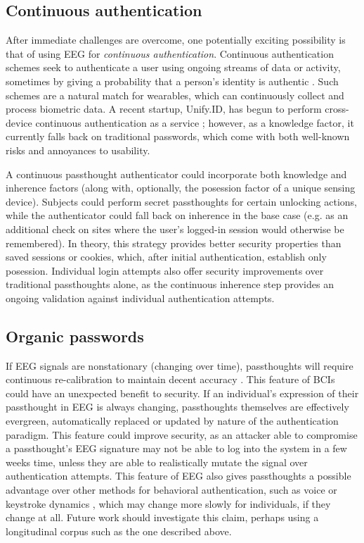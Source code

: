 \documentclass[sigconf]{acmart}
\begin{document}
\subsection{Continuous authentication}
\label{sec:orgbac1c33}

After immediate challenges are overcome,
one potentially exciting possibility is that of using EEG for \emph{continuous authentication}.
Continuous authentication schemes seek to authenticate a user using ongoing streams of data or activity, sometimes by giving a probability that a person's identity is authentic \cite{Bojinov2012}.
Such schemes are a natural match for wearables, which can continuously collect and process biometric data.
A recent startup, Unify.ID, has begun to perform cross-device continuous authentication as a service \cite{UnifyID2017};
however, as a knowledge factor, it currently falls back on traditional passwords, which come with both well-known risks and annoyances to usability.

A continuous passthought authenticator could incorporate both knowledge and inherence factors (along with, optionally, the posession factor of a unique sensing device).
Subjects could perform secret passthoughts for certain unlocking actions,
while the authenticator could fall back on inherence in the base case (e.g. as an additional check on sites where the user's logged-in session would otherwise be remembered).
In theory, this strategy provides better security properties than saved sessions or cookies, 
which, after initial authentication, establish only posession. 
Individual login attempts also offer security improvements over traditional passthoughts alone, as the continuous inherence step provides an ongoing validation against individual authentication attempts.

\subsection{Organic passwords}
\label{sec:org252a6e3}

If EEG signals are nonstationary (changing over time), passthoughts will require
continuous re-calibration to maintain decent accuracy \cite{Vidaurre2006a}. This
feature of BCIs could have an unexpected benefit to security. If an individual's
expression of their passthought in EEG is always changing, passthoughts
themselves are effectively evergreen, automatically replaced or updated by
nature of the authentication paradigm. This feature could improve security, as
an attacker able to compromise a passthought's EEG signature may not be able to
log into the system in a few weeks time, unless they are able to realistically
mutate the signal over authentication attempts. This feature of EEG also gives
passthoughts a possible advantage over other methods for behavioral
authentication, such as voice or keystroke dynamics \cite{Monrose1997}, which may
change more slowly for individuals, if they change at all. Future work should
investigate this claim, perhaps using a longitudinal corpus such as the one
described above.
\end{document}
